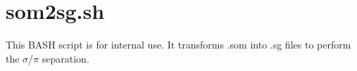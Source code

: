 \documentclass[a4paper,11pt,openany]{memoir}
\begin{document}
\section{som2sg.sh}
This BASH script is for internal use. It transforms .som into .sg files to perform the $\sigma$/$\pi$ separation.

%


\printbibliography
\end{document}
